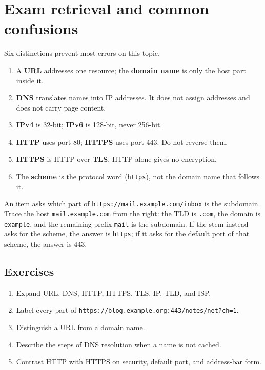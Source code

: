 \section{Exam retrieval and common confusions}
Six distinctions prevent most errors on this topic.
\begin{enumerate}
  \item A \textbf{URL} addresses one resource; the \textbf{domain name} is
    only the host part inside it.
  \item \textbf{DNS} translates names into IP addresses. It does not assign
    addresses and does not carry page content.
  \item \textbf{IPv4} is 32-bit; \textbf{IPv6} is 128-bit, never 256-bit.
  \item \textbf{HTTP} uses port 80; \textbf{HTTPS} uses port 443. Do not
    reverse them.
  \item \textbf{HTTPS} is HTTP over \textbf{TLS}. HTTP alone gives no
    encryption.
  \item The \textbf{scheme} is the protocol word (\texttt{https}), not the
    domain name that follows it.
\end{enumerate}

\begin{example}
An item asks which part of \texttt{https://mail.example.com/inbox} is the
subdomain. Trace the host \texttt{mail.example.com} from the right: the TLD
is \texttt{.com}, the domain is \texttt{example}, and the remaining prefix
\texttt{mail} is the subdomain. If the stem instead asks for the scheme,
the answer is \texttt{https}; if it asks for the default port of that
scheme, the answer is 443.
\end{example}

\subsection*{Exercises}
\begin{enumerate}[label=\arabic*.]
  \item Expand URL, DNS, HTTP, HTTPS, TLS, IP, TLD, and ISP.
  \item Label every part of \texttt{https://blog.example.org:443/notes/net?ch=1}.
  \item Distinguish a URL from a domain name.
  \item Describe the steps of DNS resolution when a name is not cached.
  \item Contrast HTTP with HTTPS on security, default port, and address-bar
    form.
\end{enumerate}

